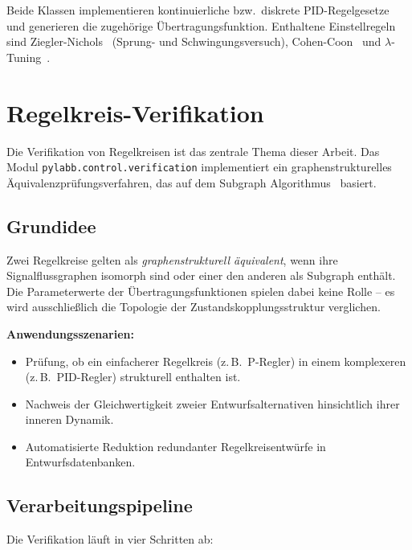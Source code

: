 \documentclass[a4paper,12pt]{article}
\theoremstyle{definition}
\begin{document}
Beide Klassen implementieren kontinuierliche bzw.\ diskrete PID-Regelgesetze
und generieren die zugehörige Übertragungsfunktion. Enthaltene Einstellregeln
sind Ziegler-Nichols~\cite{ziegler1942} (Sprung- und Schwingungsversuch),
Cohen-Coon~\cite{cohencoon} und $\lambda$-Tuning~\cite{astrom}.

\section{Regelkreis-Verifikation}
\label{sec:verifikation}

Die Verifikation von Regelkreisen ist das zentrale Thema dieser Arbeit.
Das Modul \texttt{pylabb.control.verification} implementiert ein
graphenstrukturelles Äquivalenzprü\-fungs\-verfahren, das auf dem
Subgraph Algorithmus~\cite{subgraph} basiert.

\subsection{Grundidee}

Zwei Regelkreise gelten als \emph{graphenstrukturell äquivalent}, wenn
ihre Signalflussgraphen isomorph sind oder einer den anderen als Subgraph
enthält. Die Parameterwerte der Übertragungsfunktionen spielen dabei keine
Rolle -- es wird ausschließlich die Topologie der Zustandskopplungsstruktur
verglichen.

\textbf{Anwendungsszenarien:}
\begin{itemize}
    \item Prüfung, ob ein einfacherer Regelkreis (z.\,B.\ P-Regler) in einem
          komplexeren (z.\,B.\ PID-Regler) strukturell enthalten ist.
    \item Nachweis der Gleichwertigkeit zweier Entwurfsalternativen
          hinsichtlich ihrer inneren Dynamik.
    \item Automatisierte Reduktion redundanter Regelkreisentwürfe in
          Entwurfsdatenbanken.
\end{itemize}

\subsection{Verarbeitungspipeline}

Die Verifikation läuft in vier Schritten ab:
\end{document}
